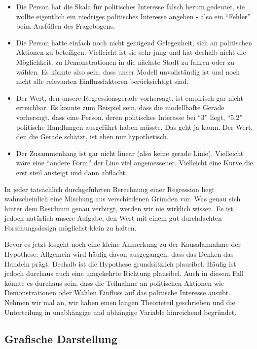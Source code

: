 \documentclass[
]{book}
\begin{document}
\begin{itemize}
\item
  Die Person hat die Skala für politisches Interesse falsch herum gedeutet, sie wollte eigentlich ein niedriges politisches Interesse angeben - also ein ``Fehler'' beim Ausfüllen des Fragebogens.
\item
  Die Person hatte einfach noch nicht genügend Gelegenheit, sich an politischen Aktionen zu beteiligen. Vielleicht ist sie sehr jung und hat deshalb nicht die Möglichkeit, zu Demonstrationen in die nächste Stadt zu fahren oder zu wählen. Es könnte also sein, dass unser Modell unvollständig ist und noch nicht alle relevanten Einflussfaktoren berücksichtigt sind.
\item
  Der Wert, den unsere Regressionsgerade vorhersagt, ist empirisch gar nicht erreichbar. Es könnte zum Beispiel sein, dass die modellhafte Gerade vorhersagt, dass eine Person, deren politisches Interesse bei ``3'' liegt, ``5,2'' politische Handlungen ausgeführt haben müsste. Das geht ja kaum. Der Wert, den die Gerade schätzt, ist eben nur hypothetisch.
\item
  Der Zusammenhang ist gar nicht linear (also keine gerade Linie). Vielleicht wäre eine ``andere Form'' der Line viel angemessener. Vielleicht eine Kurve die erst steil ansteigt und dann abflacht.
\end{itemize}

In jeder tatsächlich durchgeführten Berechnung einer Regression liegt wahrscheinlich eine Mischung aus verschiedenen Gründen vor. Was genau sich hinter dem Residuum genau verbirgt, werden wir nie wirklich wissen. Es ist jedoch natürlich unsere Aufgabe, den Wert mit einem gut durchdachten Forschungsdesign möglichst klein zu halten.

Bevor es jetzt losgeht noch eine kleine Anmerkung zu der Kausalannahme der Hypothese: Allgemein wird häufig davon ausgegangen, dass das Denken das Handeln prägt. Deshalb ist die Hypothese grundsätzlich plausibel. Häufig ist jedoch durchaus auch eine umgekehrte Richtung plausibel. Auch in diesem Fall könnte es durchaus sein, dass die Teilnahme an politischen Aktionen wie Demonstrationen oder Wahlen Einfluss auf das politische Interesse ausübt. Nehmen wir mal an, wir haben einen langen Theorieteil geschrieben und die Unterteilung in unabhängige und abhängige Variable hinreichend begründet.

\hypertarget{grafische-darstellung}{%
\subsection{Grafische Darstellung}\label{grafische-darstellung}}
\end{document}
